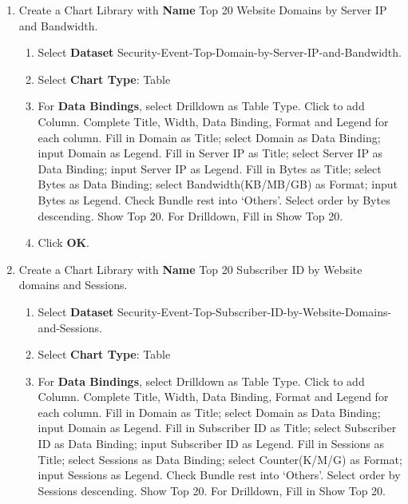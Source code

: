 \begin{description}
\begin{enumerate}
\begin{enumerate}
            \item	Select \textbf{Chart Type}: Table
            \item	For \textbf{Data Bindings}, select Drilldown as Table Type. Click to add Column. Complete Title, Width, Data Binding, Format and Legend for each column. Fill in Domain as Title; select Domain as Data Binding; input Domain as Legend. Fill in Sessions as Title; select Sessions as Data Binding; select Counter(K/M/G) as Format; input Sessions as Legend. Fill in Internal IP as Title; select Internal IP as Data Binding; input Internal IP as Legend. Check Bundle rest into ‘Others’. Select order by Sessions descending. Show Top 20. For Drilldown, Fill in Show Top 20. 
            \item	Click \textbf{OK}.
        \end{enumerate}
        \item Create a Chart Library with \textbf{Name} Top 20 Website Domains by Server IP and Bandwidth.
        \begin{enumerate}
            \item	Select \textbf{Dataset} Security-Event-Top-Domain-by-Server-IP-and-Bandwidth.
            \item	Select \textbf{Chart Type}: Table
            \item	For \textbf{Data Bindings}, select Drilldown as Table Type. Click to add Column. Complete Title, Width, Data Binding, Format and Legend for each column. Fill in Domain as Title; select Domain as Data Binding; input Domain as Legend. Fill in Server IP as Title; select Server IP as Data Binding; input Server IP as Legend. Fill in Bytes as Title; select Bytes as Data Binding; select Bandwidth(KB/MB/GB) as Format; input Bytes as Legend. Check Bundle rest into ‘Others’. Select order by Bytes descending. Show Top 20. For Drilldown, Fill in Show Top 20. 
            \item	Click \textbf{OK}.
        \end{enumerate}
        \item Create a Chart Library with \textbf{Name} Top 20 Subscriber ID by Website domains and Sessions.
        \begin{enumerate}
            \item	Select \textbf{Dataset} Security-Event-Top-Subscriber-ID-by-Website-Domains-and-Sessions.
            \item	Select \textbf{Chart Type}: Table
            \item	For \textbf{Data Bindings}, select Drilldown as Table Type. Click to add Column. Complete Title, Width, Data Binding, Format and Legend for each column. Fill in Domain as Title; select Domain as Data Binding; input Domain as Legend. Fill in Subscriber ID as Title; select Subscriber ID as Data Binding; input Subscriber ID as Legend. Fill in Sessions as Title; select Sessions as Data Binding; select Counter(K/M/G) as Format; input Sessions as Legend. Check Bundle rest into ‘Others’. Select order by Sessions descending. Show Top 20. For Drilldown, Fill in Show Top 20. 

\end{enumerate}
\end{enumerate}
\end{description}
